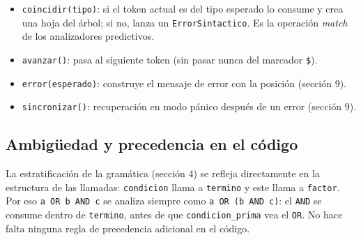 \begin{itemize}
    \item \texttt{coincidir(tipo)}: si el token actual es del tipo esperado lo consume y crea una hoja del árbol; si no, lanza un \texttt{ErrorSintactico}. Es la operación \emph{match} de los analizadores predictivos.
    \item \texttt{avanzar()}: pasa al siguiente token (sin pasar nunca del marcador \texttt{\$}).
    \item \texttt{error(esperado)}: construye el mensaje de error con la posición (sección 9).
    \item \texttt{sincronizar()}: recuperación en modo pánico después de un error (sección 9).
\end{itemize}

\subsection{Ambigüedad y precedencia en el código}

La estratificación de la gramática (sección 4) se refleja directamente en la estructura de las llamadas: \texttt{condicion} llama a \texttt{termino} y este llama a \texttt{factor}. Por eso \texttt{a OR b AND c} se analiza siempre como \texttt{a OR (b AND c)}: el \texttt{AND} se consume dentro de \texttt{termino}, antes de que \texttt{condicion\_prima} vea el \texttt{OR}. No hace falta ninguna regla de precedencia adicional en el código.

\newpage
